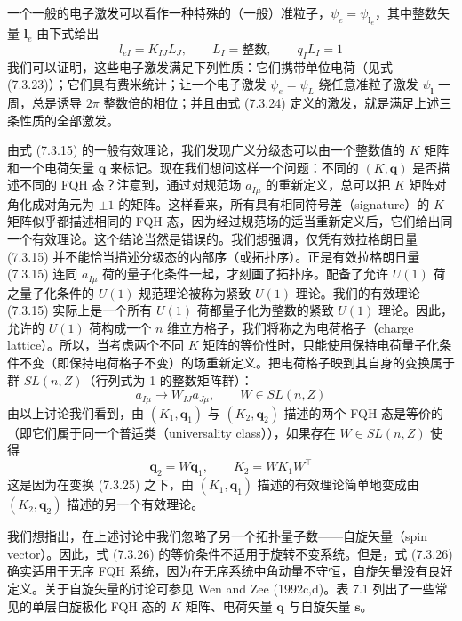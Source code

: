 一个一般的电子激发可以看作一种特殊的（一般）准粒子，$\psi_{e}=\psi_{\pmb{l}_{e}}$，其中整数矢量 $\pmb{l}_{e}$ 由下式给出
\begin{equation*}
l_{eI}=K_{IJ}L_{J},\qquad L_{I}=\text{整数},\qquad q_{I}L_{I}=1 \tag{7.3.24}
\end{equation*}
我们可以证明，这些电子激发满足下列性质：它们携带单位电荷（见式 (7.3.23)）；它们具有费米统计；让一个电子激发 $\psi_{e}=\psi_{L}$ 绕任意准粒子激发 $\psi_{\pmb{l}}$ 一周，总是诱导 $2\pi$ 整数倍的相位；并且由式 (7.3.24) 定义的激发，就是满足上述三条性质的全部激发。

由式 (7.3.15) 的一般有效理论，我们发现广义分级态可以由一个整数值的 $K$ 矩阵和一个电荷矢量 $\boldsymbol{q}$ 来标记。现在我们想问这样一个问题：不同的 $(K,\boldsymbol{q})$ 是否描述不同的 FQH 态？注意到，通过对规范场 $a_{I\mu}$ 的重新定义，总可以把 $K$ 矩阵对角化成对角元为 $\pm1$ 的矩阵。这样看来，所有具有相同符号差（signature）的 $K$ 矩阵似乎都描述相同的 FQH 态，因为经过规范场的适当重新定义后，它们给出同一个有效理论。这个结论当然是错误的。我们想强调，仅凭有效拉格朗日量 (7.3.15) 并不能恰当描述分级态的内部序（或拓扑序）。正是有效拉格朗日量 (7.3.15) 连同 $a_{I\mu}$ 荷的量子化条件一起，才刻画了拓扑序。配备了允许 $U(1)$ 荷之量子化条件的 $U(1)$ 规范理论被称为紧致 $U(1)$ 理论。我们的有效理论 (7.3.15) 实际上是一个所有 $U(1)$ 荷都量子化为整数的紧致 $U(1)$ 理论。因此，允许的 $U(1)$ 荷构成一个 $n$ 维立方格子，我们将称之为电荷格子（charge lattice）。所以，当考虑两个不同 $K$ 矩阵的等价性时，只能使用保持电荷量子化条件不变（即保持电荷格子不变）的场重新定义。把电荷格子映到其自身的变换属于群 $SL(n,Z)$（行列式为 1 的整数矩阵群）：
\begin{equation*}
a_{I\mu}\rightarrow W_{IJ}a_{J\mu},\qquad W\in SL(n,Z) \tag{7.3.25}
\end{equation*}
由以上讨论我们看到，由 $(K_{1},\boldsymbol{q}_{1})$ 与 $(K_{2},\boldsymbol{q}_{2})$ 描述的两个 FQH 态是等价的（即它们属于同一个普适类（universality class）），如果存在 $W\in SL(n,Z)$ 使得
\begin{equation*}
\boldsymbol{q}_{2}=W\boldsymbol{q}_{1},\qquad K_{2}=WK_{1}W^{\top} \tag{7.3.26}
\end{equation*}
这是因为在变换 (7.3.25) 之下，由 $(K_{1},\boldsymbol{q}_{1})$ 描述的有效理论简单地变成由 $(K_{2},\boldsymbol{q}_{2})$ 描述的另一个有效理论。

我们想指出，在上述讨论中我们忽略了另一个拓扑量子数——自旋矢量（spin vector）。因此，式 (7.3.26) 的等价条件不适用于旋转不变系统。但是，式 (7.3.26) 确实适用于无序 FQH 系统，因为在无序系统中角动量不守恒，自旋矢量没有良好定义。关于自旋矢量的讨论可参见 Wen and Zee (1992c,d)。表 7.1 列出了一些常见的单层自旋极化 FQH 态的 $K$ 矩阵、电荷矢量 $\boldsymbol{q}$ 与自旋矢量 $\boldsymbol{s}$。

